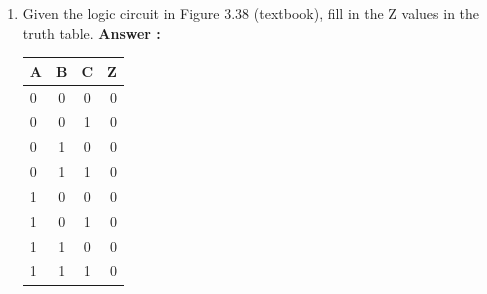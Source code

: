 \documentclass[a4paper,11pt]{article}
\begin{document}
\begin{enumerate}
\item Given the logic circuit in Figure 3.38 (textbook), fill in the Z values in the truth table.
\textbf{Answer :} 
\begin{tabular}{ l | c | c | r }
  A & B & C & Z \\
  \hline 
  0 & 0 & 0 & 0 \\
  \hline
  0 & 0 & 1 & 0 \\
  \hline 
  0 & 1 & 0 & 0 \\
  \hline
  0 & 1 & 1 & 0 \\
  \hline 
  1 & 0 & 0 & 0 \\
  \hline
  1 & 0 & 1 & 0 \\
  \hline 
  1 & 1 & 0 & 0 \\
  \hline 
  1 & 1 & 1 & 0 \\
\end{tabular}

\end{enumerate}
\end{document}
